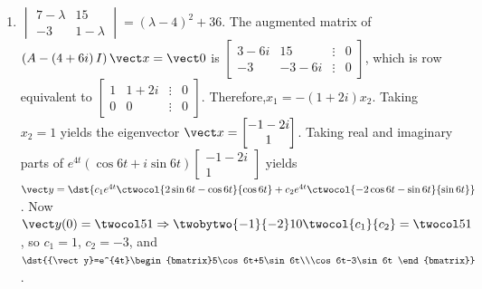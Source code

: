 \documentclass[openany]{book}
\newenvironment{sectionSolutions}{
 \begin{enumerate}[item-label={\thesection.\arabic{enumi}.}]
}{
 \end{enumerate}
}
\begin{document}
\begin{sectionSolutions}
The real and imaginary parts of
$e^{4t}(\cos t+i\sin t)\begin{bmatrix}2+2i
\\1+i\\2\end{bmatrix}$  are
${\vect y}_2=e^t\begin{bmatrix} 2\cos t-2\sin t\\\cos t-\sin
t\\ 2\cos t\end{bmatrix}$ and
${\vect y}_3=
c_3e^t\begin{bmatrix} 2\sin t+2\cos t\\\cos t+\sin t\\
2\sin t\end{bmatrix}$. Therefore,
\[
\dst{{\vect y}=c_1\begin{bmatrix} 1\\1\\1
\end{bmatrix}e^t+
c_2e^t\begin{bmatrix} 2\cos t-2\sin t
\\\cos t-\sin t\\ 2\cos t\end{bmatrix}+
c_3e^t\begin{bmatrix} 2\sin t+2\cos t\\\cos t+\sin t\\
2\sin t\end{bmatrix}}.
\]


\item
$\begin{vmatrix}7-\lambda&15\\-3&1-\lambda
\end{vmatrix}=(\lambda-4)^2+36$. The augmented matrix of
$\left(A-\left(4+6i\right)I\right){\vect x}={\vect 0}$ is
$\begin{bmatrix}3-6i&15&\vdots&0\\-3&-3-6i&\vdots&0
\end{bmatrix}$, which is row equivalent to
$\begin{bmatrix} 1&1+2i&\vdots&0\\ 0&0&\vdots&0
\end{bmatrix}$. Therefore,$x_1=-(1+2i)x_2$. Taking $x_2=1$ yields
the eigenvector ${\vect
x}=\begin{bmatrix}-1-2i\\1\end{bmatrix}$.
Taking real and imaginary parts of
$e^{4t}(\cos6t+i\sin6t)\begin{bmatrix}-1-2i\\1\end{bmatrix}$
yields ${\vect y}=\dst{c_1e^{4t}\ctwocol{2\sin6t-\cos6t}{\cos6t}
+c_2e^{4t}\ctwocol{-2\cos6t-\sin6t}{\sin6t}}$. Now ${\vect
y}(0)=\twocol51\Rightarrow
\twobytwo{-1}{-2}10\twocol{c_1}{c_2}=\twocol51$, so $c_1=1$, $c_2=-3$,
and $\dst{{\vect
y}=e^{4t}\begin{bmatrix}5\cos6t+5\sin6t\\\cos6t-3\sin6t
\end{bmatrix}}$.



\end{sectionSolutions}
\end{document}
